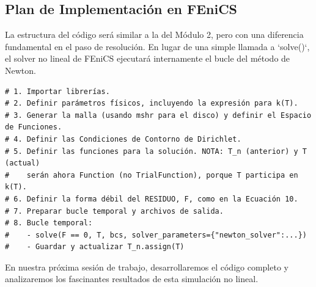 \documentclass[11pt, a4paper]{article}
\begin{document}
\subsection{Plan de Implementación en FEniCS}
La estructura del código será similar a la del Módulo 2, pero con una diferencia fundamental en el paso de resolución. En lugar de una simple llamada a `solve()`, el solver no lineal de FEniCS ejecutará internamente el bucle del método de Newton.

\begin{tcolorbox}[colback=CodeBackground, title=Estructura del Script de Simulación No Lineal]
\begin{lstlisting}[style=pythonstyle]
# 1. Importar librerías.
# 2. Definir parámetros físicos, incluyendo la expresión para k(T).
# 3. Generar la malla (usando mshr para el disco) y definir el Espacio de Funciones.
# 4. Definir las Condiciones de Contorno de Dirichlet.
# 5. Definir las funciones para la solución. NOTA: T_n (anterior) y T (actual)
#    serán ahora Function (no TrialFunction), porque T participa en k(T).
# 6. Definir la forma débil del RESIDUO, F, como en la Ecuación 10.
# 7. Preparar bucle temporal y archivos de salida.
# 8. Bucle temporal:
#    - solve(F == 0, T, bcs, solver_parameters={"newton_solver":...})
#    - Guardar y actualizar T_n.assign(T)
\end{lstlisting}
\end{tcolorbox}
En nuestra próxima sesión de trabajo, desarrollaremos el código completo y analizaremos los fascinantes resultados de esta simulación no lineal.

\newpage


\end{document}

